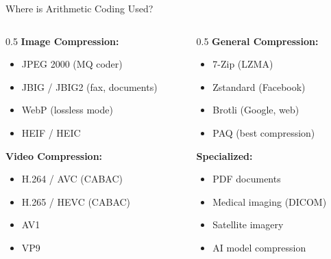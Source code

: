 \documentclass[aspectratio=169,12pt]{beamer}
\begin{document}
\begin{frame}{Where is Arithmetic Coding Used?}
    \begin{columns}
        \begin{column}{0.5\textwidth}
            \textbf{Image Compression:}
            \begin{itemize}
                \item JPEG 2000 (MQ coder)
                \item JBIG / JBIG2 (fax, documents)
                \item WebP (lossless mode)
                \item HEIF / HEIC
            \end{itemize}
            
            \vspace{0.3cm}
            \textbf{Video Compression:}
            \begin{itemize}
                \item H.264 / AVC (CABAC)
                \item H.265 / HEVC (CABAC)
                \item AV1
                \item VP9
            \end{itemize}
        \end{column}
        \begin{column}{0.5\textwidth}
            \textbf{General Compression:}
            \begin{itemize}
                \item 7-Zip (LZMA)
                \item Zstandard (Facebook)
                \item Brotli (Google, web)
                \item PAQ (best compression)
            \end{itemize}
            
            \vspace{0.3cm}
            \textbf{Specialized:}
            \begin{itemize}
                \item PDF documents
                \item Medical imaging (DICOM)
                \item Satellite imagery
                \item AI model compression
            \end{itemize}
        \end{column}
    \end{columns}
\end{frame}
\end{document}
